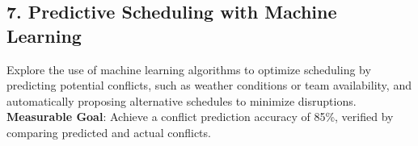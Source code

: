 \documentclass{article}
\begin{document}
\subsection*{7. Predictive Scheduling with Machine Learning}
Explore the use of machine learning algorithms to optimize scheduling by predicting potential conflicts, such as weather conditions or team availability, and automatically proposing alternative schedules to minimize disruptions. \\
\textbf{Measurable Goal}: Achieve a conflict prediction accuracy of 85\%, verified by comparing predicted and actual conflicts.
\end{document}
